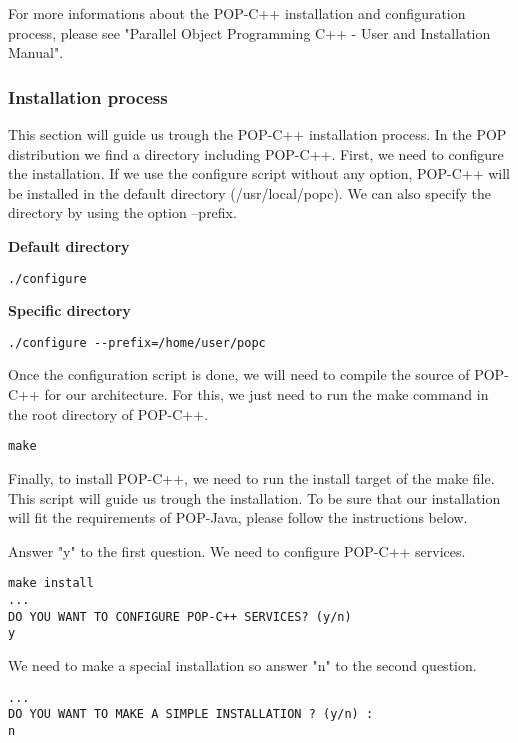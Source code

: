 For more informations about the POP-C++ installation and configuration process, please see "Parallel Object Programming C++ - User and Installation Manual"\cite{popc_intro}.

\pagebreak
\subsubsection{Installation process}
This section will guide us trough the POP-C++ installation process. In the POP distribution we find a directory including POP-C++. First, we need to configure the installation. If we use the configure script without any option, POP-C++ will be installed in the default directory (/usr/local/popc). We can also specify the directory by using the option --prefix.\s

\textbf{Default directory}
\begin{lstlisting}
./configure
\end{lstlisting}\s

\textbf{Specific directory}
\begin{lstlisting}
./configure --prefix=/home/user/popc
\end{lstlisting}\s

Once the configuration script is done, we will need to compile the source of POP-C++ for our architecture. For this, we just need to run the make command in the root directory of POP-C++.
\begin{lstlisting}
make
\end{lstlisting}\s

Finally, to install POP-C++, we need to run the install target of the make file. This script will guide us trough the installation. To be sure that our installation will fit the requirements of POP-Java, please follow the instructions below.\s

Answer "y" to the first question. We need to configure POP-C++ services.
\begin{lstlisting}
make install
...
DO YOU WANT TO CONFIGURE POP-C++ SERVICES? (y/n)
y
\end{lstlisting}\s

We need to make a special installation so answer "n" to the second question.
\begin{lstlisting}
...
DO YOU WANT TO MAKE A SIMPLE INSTALLATION ? (y/n) : 
n
\end{lstlisting}\s

